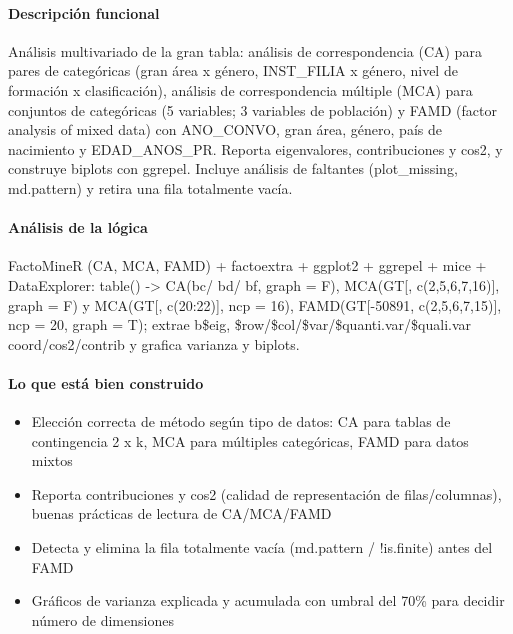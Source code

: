 \paragraph{Descripción funcional}
Análisis multivariado de la gran tabla: análisis de correspondencia (CA) para pares de categóricas (gran área x género, INST\_FILIA x género, nivel de formación x clasificación), análisis de correspondencia múltiple (MCA) para conjuntos de categóricas (5 variables; 3 variables de población) y FAMD (factor analysis of mixed data) con ANO\_CONVO, gran área, género, país de nacimiento y EDAD\_ANOS\_PR. Reporta eigenvalores, contribuciones y cos2, y construye biplots con ggrepel. Incluye análisis de faltantes (plot\_missing, md.pattern) y retira una fila totalmente vacía.

\paragraph{Análisis de la lógica}
FactoMineR (CA, MCA, FAMD) + factoextra + ggplot2 + ggrepel + mice + DataExplorer: table() -> CA(bc/ bd/ bf, graph = F), MCA(GT[, c(2,5,6,7,16)], graph = F) y MCA(GT[, c(20:22)], ncp = 16), FAMD(GT[-50891, c(2,5,6,7,15)], ncp = 20, graph = T); extrae b\$eig, \$row/\$col/\$var/\$quanti.var/\$quali.var coord/cos2/contrib y grafica varianza y biplots.

\paragraph{Lo que está bien construido}
\begin{itemize}
  \item Elección correcta de método según tipo de datos: CA para tablas de contingencia 2 x k, MCA para múltiples categóricas, FAMD para datos mixtos
  \item Reporta contribuciones y cos2 (calidad de representación de filas/columnas), buenas prácticas de lectura de CA/MCA/FAMD
  \item Detecta y elimina la fila totalmente vacía (md.pattern / !is.finite) antes del FAMD
  \item Gráficos de varianza explicada y acumulada con umbral del 70\% para decidir número de dimensiones
\end{itemize}

